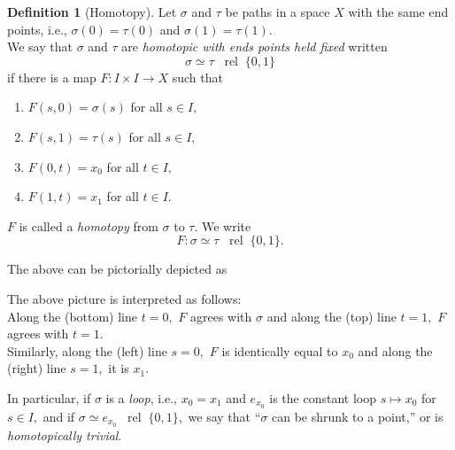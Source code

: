 \documentclass[12pt]{article}
\theoremstyle{definition}
\numberwithin{thm}{section}
\newtheorem{defn}[thm]{Definition}
\newcommand{\rel}{\;\;\operatorname{rel}\;}
\begin{document}
\begin{defn}[Homotopy]
	Let $\sigma$ and $\tau$ be paths in a space $X$ with the same end points, i.e., $\sigma(0) = \tau(0)$ and $\sigma(1) = \tau(1).$\\
	We say that $\sigma$ and $\tau$ are \emph{homotopic with ends points held fixed} written
	\begin{equation*} 
		\sigma \simeq \tau \rel \{0, 1\}
	\end{equation*}
	if there is a map $F: I \times I \to X$ such that
	\begin{enumerate}
		\item $F(s, 0) = \sigma(s)$ for all $s \in I,$
		\item $F(s, 1) = \tau(s)$ for all $s \in I,$
		\item $F(0, t) = x_0$ for all $t \in I,$
		\item $F(1, t) = x_1$ for all $t \in I.$
	\end{enumerate}
	$F$ is called a \emph{homotopy} from $\sigma$ to $\tau.$ We write
	\begin{equation*} 
		F : \sigma \simeq \tau \rel \{0, 1\}.
	\end{equation*}
\end{defn}
The above can be pictorially depicted as

\begin{center}
\end{center}

The above picture is interpreted as follows: \\
Along the (bottom) line $t = 0,$ $F$ agrees with $\sigma$ and along the (top) line $t = 1,$ $F$ agrees with $t = 1.$\\
Similarly, along the (left) line $s = 0,$ $F$ is identically equal to $x_0$ and along the (right) line $s = 1,$ it is $x_1.$

%
In particular, if $\sigma$ is a \emph{loop}, i.e., $x_0 = x_1$ and $e_{x_0}$ is the constant loop $s \mapsto x_0$ for $s \in I,$ and if $\sigma \simeq e_{x_0} \rel \{0, 1\},$ we say that ``$\sigma$ can be shrunk to a point,'' or is \emph{homotopically trivial}.
\end{document}

